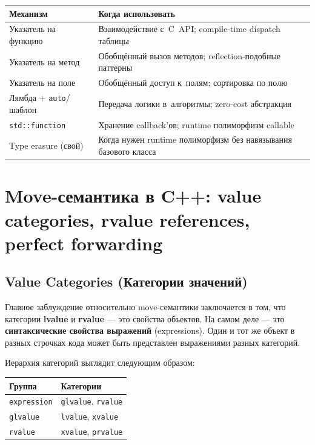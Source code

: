 \documentclass[a4paper,12pt]{article}
\begin{document}
\begin{center}
\begin{tabular}{l p{10cm}}
\toprule
\textbf{Механизм} & \textbf{Когда использовать} \\
\midrule
Указатель на функцию & Взаимодействие с~C~API; compile-time dispatch таблицы \\
\addlinespace
Указатель на метод & Обобщённый вызов методов; reflection-подобные паттерны \\
\addlinespace
Указатель на поле & Обобщённый доступ к~полям; сортировка по полю \\
\addlinespace
Лямбда + \texttt{auto}/шаблон & Передача логики в~алгоритмы; zero-cost абстракция \\
\addlinespace
\texttt{std::function} & Хранение callback'ов; runtime полиморфизм callable \\
\addlinespace
Type erasure (свой) & Когда нужен runtime полиморфизм без навязывания базового класса \\
\bottomrule
\end{tabular}
\end{center}
\section{Move-семантика в C++: value categories, rvalue references, perfect forwarding}

\subsection{Value Categories (Категории значений)}

Главное заблуждение относительно move-семантики заключается в том, что категории
\textbf{lvalue} и \textbf{rvalue} --- это свойства объектов. На самом деле --- это
\textbf{синтаксические свойства выражений} (expressions). Один и тот же объект в разных
строчках кода может быть представлен выражениями разных категорий.

Иерархия категорий выглядит следующим образом:

\begin{center}
\begin{tabular}{l l}
\toprule
\textbf{Группа} & \textbf{Категории} \\
\midrule
\texttt{expression} & \texttt{glvalue}, \texttt{rvalue} \\
\texttt{glvalue} & \texttt{lvalue}, \texttt{xvalue} \\
\texttt{rvalue} & \texttt{xvalue}, \texttt{prvalue} \\
\bottomrule
\end{tabular}
\end{center}
\end{document}
